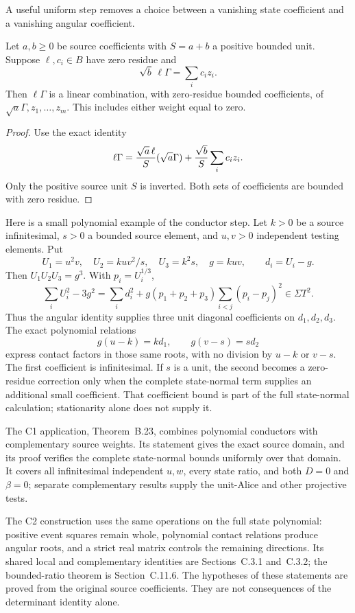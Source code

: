 A useful uniform step removes a choice between a vanishing state
coefficient and a vanishing angular coefficient.

\begin{lemma}\label{lem:insight-complementary}
Let $a,b\ge0$ be source coefficients with $S=a+b$ a positive
bounded unit. Suppose $\ell,c_i\in B$ have zero residue and
\[
 \sqrt b\,\ell\Gamma=\sum_i c_i z_i.
\]
Then $\ell\Gamma$ is a linear combination, with zero-residue
bounded coefficients, of $\sqrt a\Gamma,z_1,\ldots,z_m$.
This includes either weight equal to zero.
\end{lemma}
\begin{proof}
Use the exact identity
\[
 \ell\Gamma={\sqrt a\,\ell\over S}(\sqrt a\Gamma)
                  +{\sqrt b\over S}\sum_i c_i z_i.
\]
Only the positive source unit $S$ is inverted. Both sets of
coefficients are bounded with zero residue.
\end{proof}

Here is a small polynomial example of the conductor step.
Let $k>0$ be a source infinitesimal, $s>0$ a bounded source
element, and $u,v>0$ independent testing elements. Put
\[
 U_1=u^2v,\quad U_2=kuv^2/s,\quad U_3=k^2s,\quad g=kuv,
 \qquad d_i=U_i-g.
\]
Then $U_1U_2U_3=g^3$. With $p_i=U_i^{1/3}$,
\[
 \sum_i U_i^2-3g^2
 =\sum_i d_i^2+
       g(p_1+p_2+p_3)\sum_{i<j}(p_i-p_j)^2\in\Sigma T^2.
\]
Thus the angular identity supplies three unit diagonal coefficients
on $d_1,d_2,d_3$. The exact polynomial relations
\begin{equation}\label{eq:insight-polynomial-conductors}
 g(u-k)=k d_1,\qquad g(v-s)=s d_2
\end{equation}
express contact factors in those same roots, with no division by
$u-k$ or $v-s$. The first coefficient is infinitesimal. If $s$
is a unit, the second becomes a zero-residue correction only when
the complete state-normal term supplies an additional small
coefficient. That coefficient bound is part of the full state-normal
calculation; stationarity alone does not supply it.

The C1 application, Theorem~B.23,
combines polynomial conductors with complementary source weights.
Its statement gives the exact source domain, and its proof verifies
the complete state-normal bounds uniformly over that domain.
It covers all infinitesimal independent $u,w$, every state ratio,
and both $D=0$ and $\beta=0$; separate complementary results
supply the unit-Alice and other projective tests.

The C2 construction uses the same operations on the full state
polynomial: positive event squares remain whole, polynomial contact
relations produce angular roots, and a strict real matrix controls
the remaining directions. Its shared local and complementary
identities are Sections~C.3.1
and~C.3.2; the bounded-ratio theorem is
Section~C.11.6. The hypotheses of these
statements are proved from the original source coefficients.
They are not consequences of the determinant identity alone.

